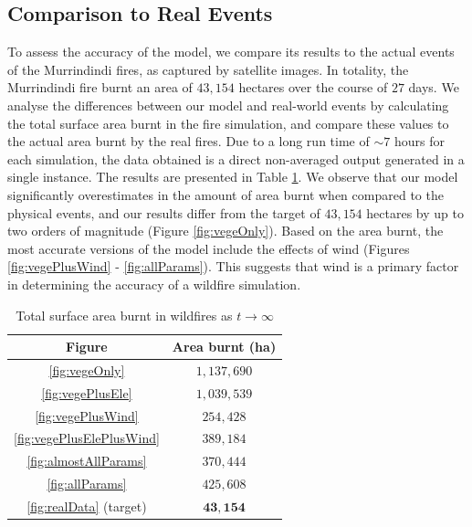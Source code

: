 \subsection{Comparison to Real Events}
To assess the accuracy of the model, we compare its results to the actual events of the Murrindindi fires, as captured by satellite images. In totality, the Murrindindi fire burnt an area of $43,154$ hectares over the course of $27$ days. We analyse the differences between our model and real-world events by calculating the total surface area burnt in the fire simulation, and compare these values to the actual area burnt by the real fires. Due to a long run time of $\sim 7$ hours for each simulation, the data obtained is a direct non-averaged output generated in a single instance. The results are presented in Table \ref{Tab:areaburnt}. \newline
\indent We observe that our model significantly overestimates in the amount of area burnt when compared to the physical events, and our results differ from the target of $43,154$ hectares by up to two orders of magnitude (Figure \ref{fig:vegeOnly}). Based on the area burnt, the most accurate versions of the model include the effects of wind (Figures \ref{fig:vegePlusWind} - \ref{fig:allParams}). This suggests that wind is a primary factor in determining the accuracy of a wildfire simulation.

\newpage

\begin{table}[h!]
    \centering
    \begin{tabular}{|c|c|}
    \hline
     \textbf{Figure} & \textbf{Area burnt} (ha)\\ \hline
     \ref{fig:vegeOnly} & $1,137,690$ \\ \hline
     \ref{fig:vegePlusEle} & $1,039,539$ \\ \hline
     \ref{fig:vegePlusWind} & $254,428$\\ \hline
     \ref{fig:vegePlusElePlusWind} & $389,184$\\ \hline
     \ref{fig:almostAllParams} & $370,444$\\ \hline
     \ref{fig:allParams} & $425,608$\\ \hline
     \ref{fig:realData} (target) & $\mathbf{43,154}$\\ \hline
    \end{tabular}
    \caption{Total surface area burnt in wildfires as $t\xrightarrow{}\infty$}\label{Tab:areaburnt}
\end{table}

